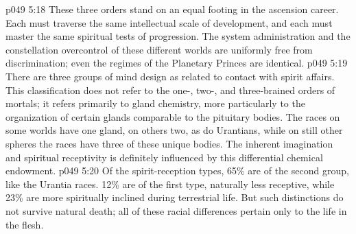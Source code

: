 \vs p049 5:18 These three orders stand on an equal footing in the ascension career. Each must traverse the same intellectual scale of development, and each must master the same spiritual tests of progression. The system administration and the constellation overcontrol of these different worlds are uniformly free from discrimination; even the regimes of the Planetary Princes are identical.
\vs p049 5:19 \bibnobreakspace {} There are three groups of mind design as related to contact with spirit affairs. This classification does not refer to the one-, two-, and three\hyp{}brained orders of mortals; it refers primarily to gland chemistry, more particularly to the organization of certain glands comparable to the pituitary bodies. The races on some worlds have one gland, on others two, as do Urantians, while on still other spheres the races have three of these unique bodies. The inherent imagination and spiritual receptivity is definitely influenced by this differential chemical endowment.
\vs p049 5:20 Of the spirit\hyp{}reception types, 65\% are of the second group, like the Urantia races. 12\% are of the first type, naturally less receptive, while 23\% are more spiritually inclined during terrestrial life. But such distinctions do not survive natural death; all of these racial differences pertain only to the life in the flesh.
